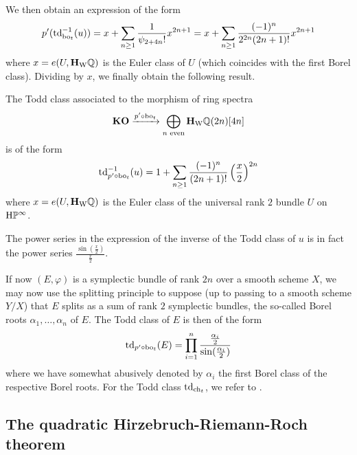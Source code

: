 We then obtain an expression of the form
\[
p'(\operatorname{td}_{\mathrm{bo}_t}^{-1}(u))= x+\sum_{n\geq 1}\frac 1{\psi_{2+4n}!} x^{2n+1}=x+\sum_{n\geq 1}\frac {(-1)^n}{2^{2n}(2n+1)!} x^{2n+1}
\]
where $x=e(U,\mathbf{H}_\mathrm{W}\mathbb{Q})$ is the Euler class of $U$ (which coincides with the first Borel class). Dividing by $x$, we finally obtain the following result.

\begin{prop}\label{prop:Toddquadratic}
The Todd class associated to the morphism of ring spectra 
\[
\mathbf{KO} \xrightarrow{p'\circ \mathrm{bo}_t} \bigoplus_{n \text{ even}} \mathbf{H}_\mathrm{W}\mathbb{Q}(2n)[4n]
\]
is of the form
\[
\operatorname{td}_{p'\circ\mathrm{bo}_t}^{-1}(u)=1 +\sum_{n\geq 1}\frac {(-1)^n}{(2n+1)!} \left(\frac x2\right)^{2n}
\]
where $x=e(U,\mathbf{H}_\mathrm{W}\mathbb{Q})$ is the Euler class of the universal rank $2$ bundle $U$ on $\mathrm{H}\mathbb P^{\infty}$.
\end{prop}

\begin{rem}
The power series in the expression of the inverse of the Todd class of $u$ is in fact the power series $\frac{\sin (\frac x2)}{\frac x2}$.
\end{rem}

If now $(E,\varphi)$ is a symplectic bundle of rank $2n$ over a smooth scheme $X$, we may now use the splitting principle to suppose (up to passing to a smooth scheme $Y/X$) that $E$ splits as a sum of rank $2$ symplectic bundles, the so-called Borel roots $\alpha_1,\ldots,\alpha_n$ of $E$. The Todd class of $E$ is then of the form
\[
\operatorname{td}_{p'\circ\mathrm{bo}_t}(E)=\prod_{i=1}^n\frac{\frac {\alpha_i}2}{\sin (\frac {\alpha_i}2)}
\]
where we have somewhat abusively denoted by $\alpha_i$ the first Borel class of the respective Borel roots. For the Todd class $\operatorname{td}_{\mathrm{ch}_t}$, we refer to \cite[Example 3.2.4]{Fulton98}. 

\subsection{The quadratic Hirzebruch-Riemann-Roch theorem}

